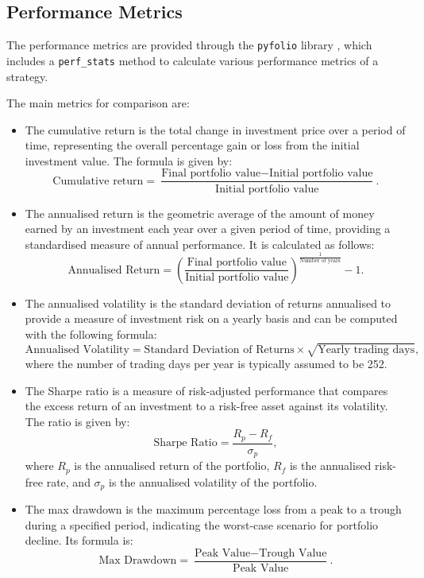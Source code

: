 \subsection{Performance Metrics} \label{sec:performance-metrics}

The performance metrics are provided through the \texttt{pyfolio} library \cite{pyfolio}, which includes a \texttt{perf\_stats} method to calculate various performance metrics of a strategy. 

The main metrics for comparison are:
\begin{itemize}
    \item The cumulative return is the total change in investment price over a period of time, representing the overall percentage gain or loss from the initial investment value. The formula is given by:
    \begin{equation}
        \text{Cumulative return} = \frac{\text{Final portfolio value} - \text{Initial portfolio value}}{\text{Initial portfolio value}}.
    \end{equation}
    \item The annualised return is the geometric average of the amount of money earned by an investment each year over a given period of time, providing a standardised measure of annual performance. It is calculated as follows:
    \begin{equation}
        \text{Annualised Return} = \left(\frac{\text{Final portfolio value}}{\text{Initial portfolio value}}\right)^{\frac{1}{\text{Number of years}}} - 1.
    \end{equation}
    \item The annualised volatility is the standard deviation of returns annualised to provide a measure of investment risk on a yearly basis and can be computed with the following formula:
    \begin{equation}
        \text{Annualised Volatility} = \text{Standard Deviation of Returns} \times \sqrt{\text{Yearly trading days}},
    \end{equation}
    where the number of trading days per year is typically assumed to be 252.
    \item The Sharpe ratio is a measure of risk-adjusted performance that compares the excess return of an investment to a risk-free asset against its volatility. The ratio is given by:
    \begin{equation}
        \text{Sharpe Ratio} = \frac{R_p - R_f}{\sigma_p},
    \end{equation}
    where $R_p$ is the annualised return of the portfolio, $R_f$ is the annualised risk-free rate, and $\sigma_p$ is the annualised volatility of the portfolio.
    \item The max drawdown is the maximum percentage loss from a peak to a trough during a specified period, indicating the worst-case scenario for portfolio decline. Its formula is:
    \begin{equation}
        \text{Max Drawdown} = \frac{\text{Peak Value} - \text{Trough Value}}{\text{Peak Value}}.
    \end{equation}
\end{itemize}

